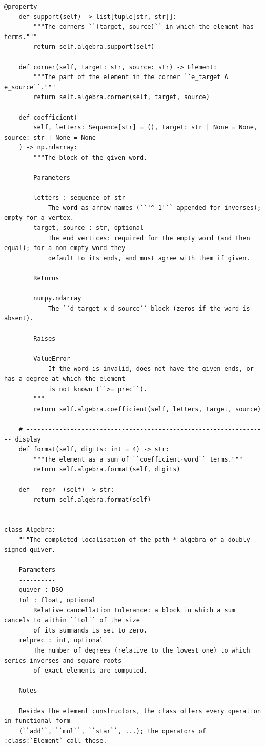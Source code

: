 \documentclass[12pt, a4paper]{report}
\theoremstyle{plain}
\theoremstyle{definition}
\theoremstyle{remark}
\theoremstyle{plain}
\begin{document}
\begin{lstlisting}[style=dsqcode]
    @property
    def support(self) -> list[tuple[str, str]]:
        """The corners ``(target, source)`` in which the element has terms."""
        return self.algebra.support(self)

    def corner(self, target: str, source: str) -> Element:
        """The part of the element in the corner ``e_target A e_source``."""
        return self.algebra.corner(self, target, source)

    def coefficient(
        self, letters: Sequence[str] = (), target: str | None = None, source: str | None = None
    ) -> np.ndarray:
        """The block of the given word.

        Parameters
        ----------
        letters : sequence of str
            The word as arrow names (``'^-1'`` appended for inverses); empty for a vertex.
        target, source : str, optional
            The end vertices: required for the empty word (and then equal); for a non-empty word they
            default to its ends, and must agree with them if given.

        Returns
        -------
        numpy.ndarray
            The ``d_target x d_source`` block (zeros if the word is absent).

        Raises
        ------
        ValueError
            If the word is invalid, does not have the given ends, or has a degree at which the element
            is not known (``>= prec``).
        """
        return self.algebra.coefficient(self, letters, target, source)

    # ------------------------------------------------------------------ display
    def format(self, digits: int = 4) -> str:
        """The element as a sum of ``coefficient·word`` terms."""
        return self.algebra.format(self, digits)

    def __repr__(self) -> str:
        return self.algebra.format(self)


class Algebra:
    """The completed localisation of the path *-algebra of a doubly-signed quiver.

    Parameters
    ----------
    quiver : DSQ
    tol : float, optional
        Relative cancellation tolerance: a block in which a sum cancels to within ``tol`` of the size
        of its summands is set to zero.
    relprec : int, optional
        The number of degrees (relative to the lowest one) to which series inverses and square roots
        of exact elements are computed.

    Notes
    -----
    Besides the element constructors, the class offers every operation in functional form
    (``add``, ``mul``, ``star``, ...); the operators of :class:`Element` call these.


\end{lstlisting}
\end{document}
